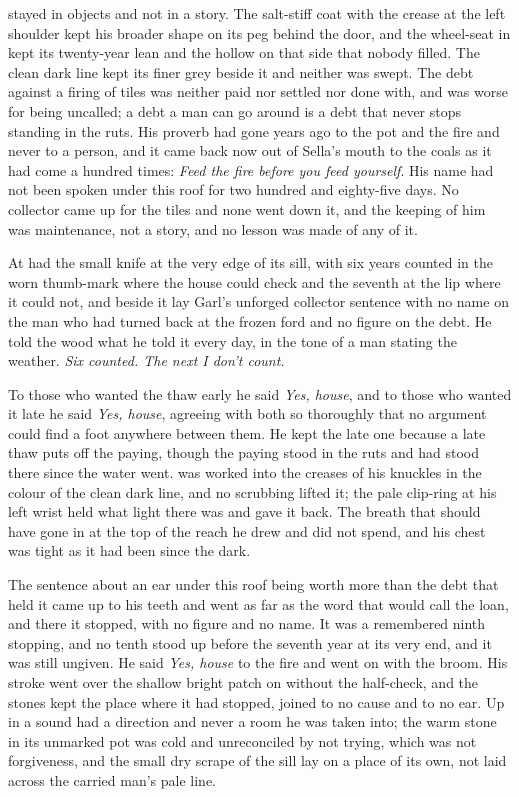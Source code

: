  stayed in objects and not in a story. The salt-stiff coat with the crease at the left shoulder kept his broader shape on its peg behind the door, and the wheel-seat in  kept its twenty-year lean and the hollow on that side that nobody filled. The clean dark line kept its finer grey beside it and neither was swept. The debt against a firing of tiles was neither paid nor settled nor done with, and was worse for being uncalled; a debt a man can go around is a debt that never stops standing in the ruts. His proverb had gone years ago to the pot and the fire and never to a person, and it came back now out of Sella's mouth to the coals as it had come a hundred times: \emph{Feed the fire before you feed yourself}. His name had not been spoken under this roof for two hundred and eighty-five days. No collector came up  for the tiles and none went down it, and the keeping of him was maintenance, not a story, and no lesson was made of any of it.

\scenebreak

At   had the small knife at the very edge of its sill, with six years counted in the worn thumb-mark where the house could check and the seventh at the lip where it could not, and beside it lay Garl's unforged collector sentence with no name on the man who had turned back at the frozen ford and no figure on the debt. He told the wood what he told it every day, in the tone of a man stating the weather. \emph{Six counted. The next I don't count.}

To those who wanted the thaw early he said \emph{Yes, house}, and to those who wanted it late he said \emph{Yes, house}, agreeing with both so thoroughly that no argument could find a foot anywhere between them. He kept the late one because a late thaw puts off the paying, though the paying stood in the ruts and had stood there since the water went.  was worked into the creases of his knuckles in the colour of the clean dark line, and no scrubbing lifted it; the pale clip-ring at his left wrist held what light there was and gave it back. The breath that should have gone in at the top of the reach he drew and did not spend, and his chest was tight as it had been since the dark.

The sentence about an ear under this roof being worth more than the debt that held it came up to his teeth and went as far as the word that would call the loan, and there it stopped, with no figure and no name. It was a remembered ninth stopping, and no tenth stood up before the seventh year at its very end, and it was still ungiven. He said \emph{Yes, house} to the fire and went on with the broom. His stroke went over the shallow bright patch on  without the half-check, and the stones kept the place where it had stopped, joined to no cause and to no ear. Up in  a sound had a direction and never a room he was taken into; the warm stone in its unmarked pot was cold and unreconciled by not trying, which was not forgiveness, and the small dry scrape of the sill lay on a place of its own, not laid across the carried man's pale line.

